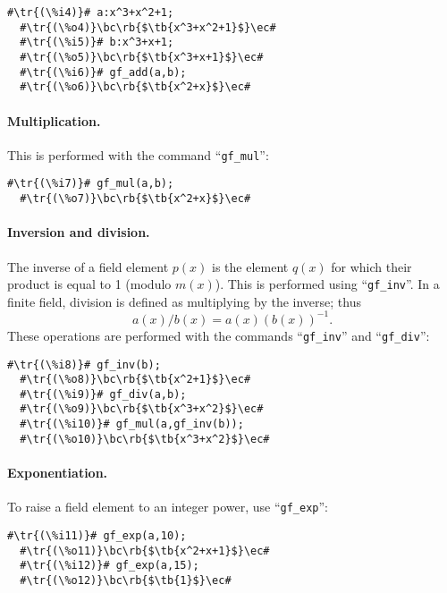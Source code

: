 \documentclass[a4paper,11pt,leqno,fleqn]{artikel3}
\newcommand{\bc}{\begin{center}}
\newcommand{\ec}{\end{center}}
\newcommand{\tr}[1]{\textcolor{red}{#1}}
\newcommand{\tb}[1]{\textcolor{blue}{#1}}
\newcommand{\rb}[1]{\raisebox{2mm}[0mm][1mm]{#1}}
\begin{document}
\begin{lstlisting}[escapechar=\#]
  #\tr{(\%i4)}# a:x^3+x^2+1;
  #\tr{(\%o4)}\bc\rb{$\tb{x^3+x^2+1}$}\ec#
  #\tr{(\%i5)}# b:x^3+x+1;
  #\tr{(\%o5)}\bc\rb{$\tb{x^3+x+1}$}\ec#
  #\tr{(\%i6)}# gf_add(a,b);
  #\tr{(\%o6)}\bc\rb{$\tb{x^2+x}$}\ec#
\end{lstlisting}

\paragraph{Multiplication.}

This is performed with the command ``\verb!gf_mul!'':

\begin{lstlisting}[escapechar=\#]
  #\tr{(\%i7)}# gf_mul(a,b);
  #\tr{(\%o7)}\bc\rb{$\tb{x^2+x}$}\ec#
\end{lstlisting}

\paragraph{Inversion and division.}

The inverse of a field element $p(x)$ is the element $q(x)$ for which their
product is equal to 1 (modulo $m(x)$).  This is performed using
``\verb!gf_inv!''.  In a finite field, division is defined as multiplying by
the inverse; thus
\[
a(x)/b(x)=a(x)(b(x))^{-1}.
\]
These operations are performed with the commands ``\verb!gf_inv!'' and
``\verb!gf_div!'':

\begin{lstlisting}[escapechar=\#]
  #\tr{(\%i8)}# gf_inv(b);
  #\tr{(\%o8)}\bc\rb{$\tb{x^2+1}$}\ec#
  #\tr{(\%i9)}# gf_div(a,b);
  #\tr{(\%o9)}\bc\rb{$\tb{x^3+x^2}$}\ec#
  #\tr{(\%i10)}# gf_mul(a,gf_inv(b));
  #\tr{(\%o10)}\bc\rb{$\tb{x^3+x^2}$}\ec#
\end{lstlisting}

\paragraph{Exponentiation.}

To raise a field element to an integer power, use ``\verb!gf_exp!'':

\begin{lstlisting}[escapechar=\#]
  #\tr{(\%i11)}# gf_exp(a,10);
  #\tr{(\%o11)}\bc\rb{$\tb{x^2+x+1}$}\ec#
  #\tr{(\%i12)}# gf_exp(a,15);
  #\tr{(\%o12)}\bc\rb{$\tb{1}$}\ec#
\end{lstlisting}
\end{document}

